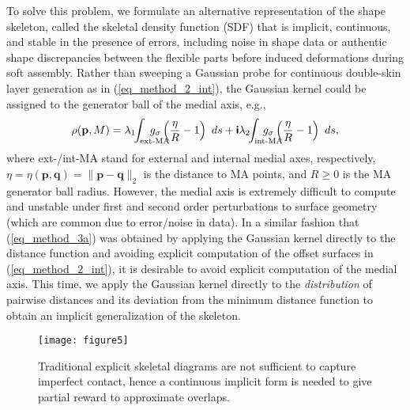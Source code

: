 \documentclass[article]{gmp2014}
\theoremstyle{definition}
\newcommand{\ii}{\text{\textsf{\textbf{i}}}}
\newcommand{\nquad}{\!\! \!\! \!\!}
\newcommand{\nqquad}{\nquad\nquad}
\begin{document}
To solve this problem, we formulate an alternative representation of the shape skeleton, called the skeletal density function (SDF) that is implicit, continuous, and stable in the presence of errors, including noise in shape data or authentic shape discrepancies between the flexible parts before induced deformations during soft assembly.
%
Rather than sweeping a Gaussian probe for continuous double-skin layer generation as in (\ref{eq_method_2_int}), the Gaussian kernel could be assigned to the generator ball of the medial axis, e.g.,
%
\begin{equation}
    \rho(\mathbf{p}, M) = \lambda_1 \!\! \int_{\text{ext-MA}} \nqquad g_\sigma \left( \frac{\eta}{R} - 1 \right) ~ds + \ii \lambda_2 \!\! \int_{\text{int-MA}} \nqquad g_\sigma \left( \frac{\eta}{R} - 1 \right) ~ds, \label{eq_method_2_int_ma}
\end{equation}
%
where ext-/int-MA stand for external and internal medial axes, respectively, $\eta = \eta(\mathbf{p}, \mathbf{q}) = \|\mathbf{p} - \mathbf{q} \|_2$ is the distance to MA points, and $R \geq 0$ is the MA generator ball radius.
However, the medial axis is extremely difficult to compute and unstable under first and second order perturbations to surface geometry \cite{Attali2009} (which are common due to error/noise in data). In a similar fashion that  (\ref{eq_method_3a}) was obtained by applying the Gaussian kernel directly to the distance function and avoiding explicit computation of the offset surfaces in (\ref{eq_method_2_int}), it is desirable to avoid explicit computation of the medial axis.
%
This time, we apply the Gaussian kernel directly to the {\it distribution} of pairwise distances and its deviation from the minimum distance function to obtain an implicit generalization of the skeleton.

%
\begin{figure}
    \centering
    \texttt{[image: figure5]}
    \caption{Traditional explicit skeletal diagrams are not sufficient to capture imperfect contact, hence a continuous implicit form is needed to give partial reward to approximate overlaps.} \label{figure5}
\end{figure}
%
\end{document}
